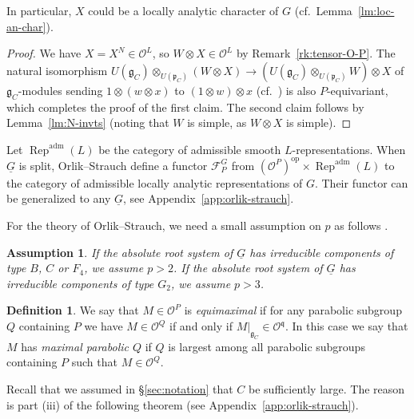\documentclass[a4paper]{amsart}
\numberwithin{equation}{section}
\newtheorem{assump}[thm]{Assumption}
\theoremstyle{remark}
\theoremstyle{definition}
\newtheorem{defn}[thm]{Definition}
\DeclareMathOperator{\Rep}{Rep}
\newcommand{\adm}{\mathrm{adm}}
\newcommand{\alggrp}[1]{\underline{#1}}
\newcommand{\opp}{\mathrm{op}}
\begin{document}
In particular, $X$ could be a locally analytic character of $G$ (cf.\ Lemma~\ref{lm:loc-an-char}).

\begin{proof}
  We have $X = X^N \in \mathcal{O}^{L}$, so $W \otimes X \in \mathcal{O}^{L}$ by Remark~\ref{rk:tensor-O-P}.
  The natural isomorphism $U(\mathfrak{g}_{C}) \otimes_{U(\mathfrak{p}_{C})} (W \otimes X) \to (U(\mathfrak{g}_{C}) \otimes_{U(\mathfrak{p}_{C})} W) \otimes X$ of $\mathfrak g_C$-modules sending $1 \otimes (w \otimes x)$ to $(1 \otimes w) \otimes x$ (cf.\ \cite[\S3.6]{humphreys-bgg}) is also $P$-equivariant, which completes the proof of the first claim.
  The second claim follows by Lemma~\ref{lm:N-invts} (noting that $W$ is simple, as $W \otimes X$ is simple).
\end{proof}

Let $\Rep^{\adm}(L)$ be the category of admissible smooth $L$-representations.
When $\alggrp{G}$ is split, Orlik--Strauch \cite{OS3} define a functor $\mathcal{F}_{P}^{G}$ from $(\mathcal{O}^{P})^{\opp}\times \Rep^{\adm}(L)$ to the category of admissible locally analytic representations of $G$.
Their functor can be generalized to any $\alggrp{G}$, see Appendix~\ref{app:orlik-strauch}.

For the theory of Orlik--Strauch, we need a small assumption on $p$ as follows \cite[Assumption 4.1]{OS3}.
\begin{assump}\label{assump:on p}
If the absolute root system of $\alggrp{G}$ has irreducible components of type $B$, $C$ or $F_{4}$, we assume $p > 2$.
If the absolute root system of $\alggrp{G}$ has irreducible components of type $G_{2}$, we assume $p > 3$.
\end{assump}

\begin{defn}
  We say that $M \in \mathcal O^P$ is \emph{equimaximal} if for any parabolic subgroup $Q$ containing $P$ we have $M \in \mathcal O^Q$ if and only if $M|_{\mathfrak g_C} \in \mathcal O^{\mathfrak q}$.
  In this case we say that $M$ has \emph{maximal parabolic $Q$} if $Q$ is largest among all parabolic subgroups containing $P$ such that $M \in \mathcal O^{Q}$.
\end{defn}

Recall that we assumed in \S\ref{sec:notation} that $C$ be sufficiently large.
The reason is part (iii) of the following theorem (see Appendix~\ref{app:orlik-strauch}).
\end{document}

